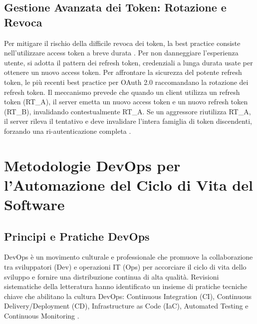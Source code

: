 \documentclass[12pt,a4paper,openright,twoside]{book}
\begin{document}
\subsection{Gestione Avanzata dei Token: Rotazione e Revoca}
Per mitigare il rischio della difficile revoca dei token, la best practice consiste nell'utilizzare access token a breve durata \cite{flanagan2024token}. Per non danneggiare l'esperienza utente, si adotta il pattern dei refresh token, credenziali a lunga durata usate per ottenere un nuovo access token. Per affrontare la sicurezza del potente refresh token, le più recenti best practice per OAuth 2.0 raccomandano la rotazione dei refresh token. Il meccanismo prevede che quando un client utilizza un refresh token (RT\_A), il server emetta un nuovo access token e un nuovo refresh token (RT\_B), invalidando contestualmente RT\_A. Se un aggressore riutilizza RT\_A, il server rileva il tentativo e deve invalidare l'intera famiglia di token discendenti, forzando una ri-autenticazione completa \cite{flanagan2024token}.

\section{Metodologie DevOps per l'Automazione del Ciclo di Vita del Software}

\subsection{Principi e Pratiche DevOps}
DevOps è un movimento culturale e professionale che promuove la collaborazione tra sviluppatori (Dev) e operazioni IT (Ops) per accorciare il ciclo di vita dello sviluppo e fornire una distribuzione continua di alta qualità. Revisioni sistematiche della letteratura hanno identificato un insieme di pratiche tecniche chiave che abilitano la cultura DevOps: Continuous Integration (CI), Continuous Delivery/Deployment (CD), Infrastructure as Code (IaC), Automated Testing e Continuous Monitoring \cite{teixeira2020systematic}.
\end{document}
